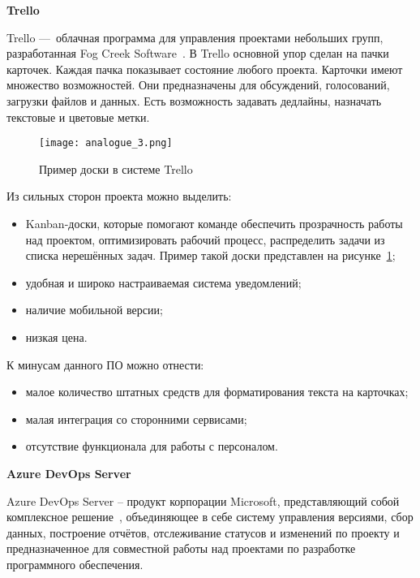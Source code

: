 \bigskip
\textbf{Trello}

Trello — облачная программа для управления проектами небольших групп, разработанная Fog Creek Software~\cite{analogue_3}. В Trello основной упор сделан на пачки карточек. Каждая пачка показывает состояние любого проекта. Карточки имеют множество возможностей. Они предназначены для обсуждений, голосований, загрузки файлов и данных. Есть возможность задавать дедлайны, назначать текстовые и цветовые метки.

\begin{figure}[ht]
    \centering
	\texttt{[image: analogue\_3.png]}
	\caption{Пример доски в системе Trello}\label{fig:analysis:analogue_3:picture}
\end{figure}

Из сильных сторон проекта можно выделить:
\begin{itemize}
    \item Kanban-доски, которые помогают команде обеспечить прозрачность работы над проектом, оптимизировать рабочий процесс, распределить задачи из списка нерешённых задач. Пример такой доски представлен на рисунке~\ref{fig:analysis:analogue_3:picture};
    \item удобная и широко настраиваемая система уведомлений;
    \item наличие мобильной версии;
    \item низкая цена.
\end{itemize}

К минусам данного ПО можно отнести:
\begin{itemize}
    \item малое количество штатных средств для форматирования текста на карточках;
    \item малая интеграция со сторонними сервисами;
    \item отсутствие функционала для работы с персоналом.
\end{itemize}

\bigskip
\textbf{Azure DevOps Server}

Azure DevOps Server – продукт корпорации Microsoft, представляющий собой комплексное решение~\cite{analogue_4}, объединяющее в себе систему управления версиями, сбор данных, построение отчётов, отслеживание статусов и изменений по проекту и предназначенное для совместной работы над проектами по разработке программного обеспечения.

